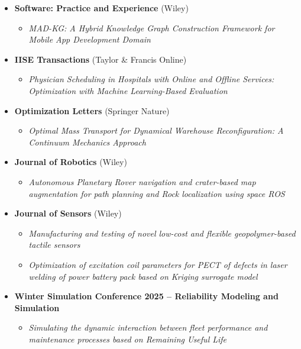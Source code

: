 \documentclass[10pt, letterpaper]{article}
\begin{document}
\begin{itemize}
 \item \textbf{Software: Practice and Experience} (Wiley)
 
\begin{itemize}
    \item \textit{MAD-KG: A Hybrid Knowledge Graph Construction Framework for Mobile App Development Domain}
\end{itemize}



 \item \textbf{IISE Transactions} (Taylor \& Francis Online)
 
\begin{itemize}
    \item \textit{Physician Scheduling in Hospitals with Online and Offline Services: Optimization with Machine Learning-Based Evaluation}
\end{itemize}


 \item \textbf{Optimization Letters} (Springer Nature)
 
\begin{itemize}
    \item \textit{Optimal Mass Transport for Dynamical Warehouse Reconfiguration: A Continuum Mechanics Approach}
\end{itemize}



    \item \textbf{Journal of Robotics} (Wiley)
 \begin{itemize}
    \item \textit{Autonomous Planetary Rover navigation and crater-based map augmentation for path planning and Rock localization using space ROS}
    \end{itemize}
    \item \textbf{Journal of Sensors} (Wiley)
    \begin{itemize}
        \item \textit{Manufacturing and testing of novel low-cost and flexible geopolymer-based tactile sensors}
        \item \textit{Optimization of excitation coil parameters for PECT of defects in laser welding of power battery pack based on Kriging surrogate model}
    \end{itemize}

    \item \textbf{Winter Simulation Conference 2025 – Reliability Modeling and Simulation}
    \begin{itemize}
        \item \textit{Simulating the dynamic interaction between fleet performance and maintenance processes based on Remaining Useful Life}
    \end{itemize}


\end{itemize}
\end{document}
